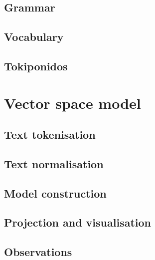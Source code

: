 \documentclass[14pt, a4paper]{extreport}
\begin{document}
\subsection{Grammar}

\subsection{Vocabulary}

\subsection{Tokiponidos}

\section{Vector space model}

\subsection{Text tokenisation}

\subsection{Text normalisation}

\subsection{Model construction}

\subsection{Projection and visualisation}

\subsection{Observations}

%
%
\end{document}
